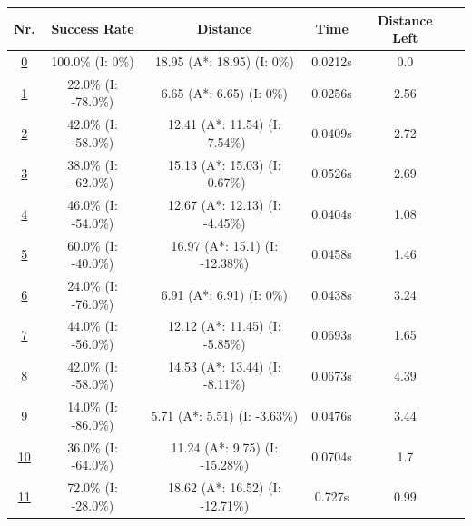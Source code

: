 \begin{table}[h!] 
\footnotesize
\centering


\begin{tabular}{|cc|c|c|c|c|c|}
\hline
\multicolumn{2}{|c|}{\textbf{Nr.}} & \textbf{Success Rate} & \textbf{Distance} & \textbf{Time} & \textbf{Distance Left}\\
\hline
\hline
\multicolumn{2}{|c|}{\cellcolor{lightgray!20} \hyperref[tab: evalalgorithms]{0}} & 100.0\% (I: 0\%) & 18.95 (A*: 18.95) (I: 0\%) & 0.0212s & 0.0\\
\hline
\hline
\multicolumn{2}{|c|}{\cellcolor{red!40} \hyperref[tab: evalalgorithms]{1}} & 22.0\% (I: -78.0\%) & 6.65 (A*: 6.65) (I: 0\%) & 0.0256s & 2.56\\
\hline
\multicolumn{2}{|c|}{\cellcolor{red!20} \hyperref[tab: evalalgorithms]{2}} & 42.0\% (I: -58.0\%) & 12.41 (A*: 11.54) (I: -7.54\%) & 0.0409s & 2.72\\
\hline
\multicolumn{2}{|c|}{\cellcolor{red!20} \hyperref[tab: evalalgorithms]{3}} & 38.0\% (I: -62.0\%) & 15.13 (A*: 15.03) (I: -0.67\%) & 0.0526s & 2.69\\
\hline
\multicolumn{2}{|c|}{\cellcolor{red!20} \hyperref[tab: evalalgorithms]{4}} & 46.0\% (I: -54.0\%) & 12.67 (A*: 12.13) (I: -4.45\%) & 0.0404s & 1.08\\
\hline
\multicolumn{2}{|c|}{\cellcolor{red!20} \hyperref[tab: evalalgorithms]{5}} & 60.0\% (I: -40.0\%) & 16.97 (A*: 15.1) (I: -12.38\%) & 0.0458s & 1.46\\
\hline
\hline
\multicolumn{2}{|c|}{\cellcolor{blue!20} \hyperref[tab: evalalgorithms]{6}} & 24.0\% (I: -76.0\%) & 6.91 (A*: 6.91) (I: 0\%) & 0.0438s & 3.24\\
\hline
\multicolumn{2}{|c|}{\cellcolor{blue!40} \hyperref[tab: evalalgorithms]{7}} & 44.0\% (I: -56.0\%) & 12.12 (A*: 11.45) (I: -5.85\%) & 0.0693s & 1.65\\
\hline
\multicolumn{2}{|c|}{\cellcolor{blue!20} \hyperref[tab: evalalgorithms]{8}} & 42.0\% (I: -58.0\%) & 14.53 (A*: 13.44) (I: -8.11\%) & 0.0673s & 4.39\\
\hline
\multicolumn{2}{|c|}{\cellcolor{blue!20} \hyperref[tab: evalalgorithms]{9}} & 14.0\% (I: -86.0\%) & 5.71 (A*: 5.51) (I: -3.63\%) & 0.0476s & 3.44\\
\hline
\multicolumn{2}{|c|}{\cellcolor{blue!20} \hyperref[tab: evalalgorithms]{10}} & 36.0\% (I: -64.0\%) & 11.24 (A*: 9.75) (I: -15.28\%) & 0.0704s & 1.7\\
\hline
\hline
\multicolumn{2}{|c|}{\cellcolor{orange!40} \hyperref[tab: evalalgorithms]{11}} & 72.0\% (I: -28.0\%) & 18.62 (A*: 16.52) (I: -12.71\%) & 0.727s & 0.99\\

\end{tabular}
\end{table}

